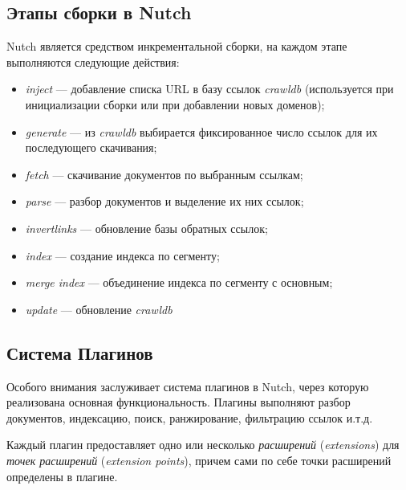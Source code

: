 \subsection{Этапы сборки в Nutch}
Nutch является средством инкрементальной сборки\cite{nutchcase}, на каждом этапе выполняются следующие действия:
\begin{itemize}
 \item \textit{inject} --- добавление списка URL в базу ссылок \textit{crawldb} (используется при инициализации сборки или при добавлении новых доменов);
 \item \textit{generate} --- из \textit{crawldb} выбирается фиксированное число ссылок для их последующего скачивания;
 \item \textit{fetch} --- скачивание документов по выбранным ссылкам;
 \item \textit{parse} --- разбор документов и выделение их них ссылок;
 \item \textit{invertlinks} --- обновление базы обратных ссылок;
 \item \textit{index} --- создание индекса по сегменту;
 \item \textit{merge index} --- объединение индекса по сегменту с основным;
 \item \textit{update} --- обновление \textit{crawldb}
\end{itemize}

\subsection{Система Плагинов}
Особого внимания заслуживает система плагинов в Nutch, через которую реализована основная функциональность. Плагины выполняют разбор документов, индексацию, поиск, ранжирование, фильтрацию ссылок и.т.д.

Каждый плагин предоставляет одно или несколько \textit{расширений} (\textit{extensions}) для \textit{точек расширений} (\textit{extension points}), причем сами по себе точки расширений определены в плагине.
